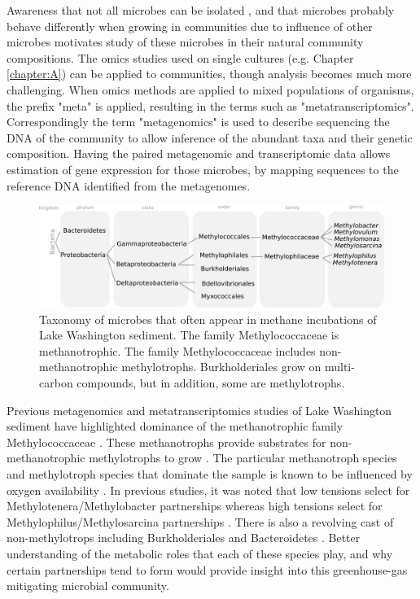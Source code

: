 Awareness that not all microbes can be isolated \cite{kaeberlein2002, stewart2012}, and that microbes probably behave differently when growing in communities due to influence of other microbes \cite{yu2016synthetic} motivates study of these microbes in their natural community compositions.
The omics studies used on single cultures (e.g. Chapter \ref{chapter:A}) can be applied to communities, though analysis becomes much more challenging.
When omics methods are applied to mixed populations of organisms, the prefix "meta" is applied, resulting in the terms such as  "metatranscriptomics".
Correspondingly the term "metagenomics" is used to describe sequencing the DNA of the community to allow inference of the abundant taxa and their genetic composition.
Having the paired metagenomic and transcriptomic data allows estimation of gene expression for those microbes, by mapping sequences to the reference DNA identified from the metagenomes.

\begin{figure}[H]
\centering
    \includegraphics[width=1.0\textwidth]{./tex/chapter2/figures/170311_taxonomy_overview.pdf}
    \begin{singlespace}
    \caption[Taxonomy of microbes known to factor into methane oxidation in Lake Washington sediment.]{
       Taxonomy of microbes that often appear in methane incubations of Lake Washington sediment.
       The family Methylococcaceae is methanotrophic.
       The family Methylococcaceae includes non-methanotrophic methylotrophs.
       Burkholderiales grow on multi-carbon compounds, but in addition, some are methylotrophs.}
    \label{fig:taxonomy}
    \end{singlespace}
\end{figure}

Previous metagenomics and metatranscriptomics studies of Lake Washington sediment have highlighted dominance of the methanotrophic family Methylococcaceae \cite{beck2013LW, beck2014LW, oshkin2015LW, hernandez2015LW}.
These methanotrophs provide substrates for non-methanotrophic methylotrophs to grow \cite{beck2013LW}.
The particular methanotroph species and methylotroph species that dominate the sample is known to be influenced by oxygen availability \cite{hernandez2015LW}.
In previous studies, it was noted that low  tensions select for Methylotenera/Methylobacter partnerships whereas high  tensions select for Methylophilus/Methylosarcina partnerships \cite{hernandez2015LW}.
There is also a revolving cast of non-methylotrops including Burkholderiales and Bacteroidetes \cite{kalyuzhnaya2008Burkholderiales, beck2014LW}.
Better understanding of the metabolic roles that each of these species play, and why certain partnerships tend to form would provide insight into this greenhouse-gas mitigating microbial community.


